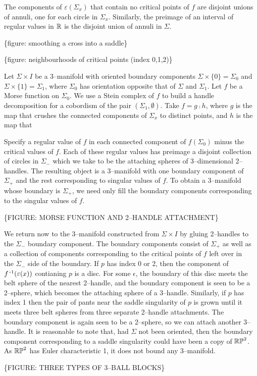 The components of $\varepsilon(\Sigma_x)$ that contain no critical points of $f$ are disjoint unions of annuli, one for each circle in $\Sigma_x$.
Similarly, the preimage of an interval of regular values in $\mathbb{R}$ is the disjoint union of annuli in $\Sigma$.

\{figure: smoothing a cross into a saddle\}

\{figure: neighbourhoods of critical points (index 0,1,2)\}



Let $\Sigma\times I$ be a 3--manifold with oriented boundary components $\Sigma\times\{0\}=\Sigma_0$ and $\Sigma\times\{1\}=\Sigma_1$, where $\Sigma_0$ has orientation opposite that of $\Sigma$ and $\Sigma_1$.
Let $f$ be a Morse function on $\Sigma_0$.
We use a Stein complex of $f$ to build a handle decomposition for a cobordism of the pair $(\Sigma_1,\emptyset)$.
Take $f=g\comp h$, where $g$ is the map that crushes the connected components of $\Sigma_x$ to distinct points, and $h$ is the map that 


 Specify a regular value of $f$ in each connected component of $f(\Sigma_0)$ minus the critical values of $f$.
Each of these regular values has preimage a disjoint collection of circles in $\Sigma_-$ which we take to be the attaching spheres of 3--dimensional 2--handles. 
The resulting object is a 3--manifold with one boundary component of $\Sigma_+$ and the rest corresponding to singular values of $f$.
To obtain a 3--manifold whose boundary is $\Sigma_+$, we need only fill the boundary components corresponding to the singular values of $f$.

\{FIGURE: MORSE FUNCTION AND 2--HANDLE ATTACHMENT\}



We return now to the 3--manifold constructed from $\Sigma\times I$ by gluing 2--handles to the $\Sigma_-$ boundary component.
The boundary components consist of $\Sigma_+$ as well as a collection of components corresponding to the critical points of $f$ left over in the $\Sigma_-$ side of the boundary.
If $p$ has index 0 or 2, then the component of $f^{\,\text{-}1}(\varepsilon(x))$ contianing $p$ is a disc.
For some $\epsilon$, the boundary of this disc meets the belt sphere of the nearest 2--handle, and the boundary component is seen to be a 2--sphere, which becomes the attaching sphere of a 3--handle.
Similarly, if $p$ has index 1 then the pair of pants near the saddle singularity of $p$ is grown until it meets three belt spheres from three separate 2--handle attachments.
The boundary component is again seen to be a 2--sphere, so we can attach another 3--handle.
It is reasonable to note that, had $\Sigma$ not been oriented, then the boundary component corresponding to a saddle singularity could have been a copy of $\mathbb{RP}^2$.
As $\mathbb{RP}^2$ has Euler characteristic 1, it does not bound any 3--manifold.

\{FIGURE: THREE TYPES OF 3--BALL BLOCKS\}
